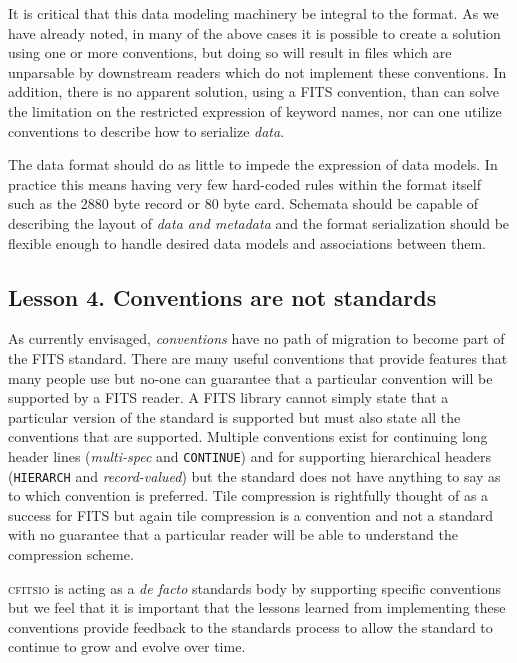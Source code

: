 \documentclass[final,authoryear,5p,times,twocolumn]{elsarticle}
\begin{document}
{{It is critical that this data modeling machinery be integral to the format.
As we have already noted, in many of the above cases it is possible to
create a solution using one or more conventions, but doing so will
result in files which are unparsable by downstream readers which
do not implement these conventions. In addition, there is no apparent
solution, using a FITS convention, than can solve the limitation on the
restricted expression of keyword names, nor can one utilize conventions
to describe how to serialize \textit{data}.


The data format should do as little to impede the expression of data
models.  In practice this means having very few hard-coded rules
within the format itself such as the 2880 byte record or 80 byte card.
Schemata should be capable of describing the layout of \textit{data and metadata}
 and the format serialization should be flexible enough to handle
desired data models and associations between them.


\subsection{Lesson 4. Conventions are not standards}

As currently envisaged, \emph{conventions} have no path of migration
to become part of the FITS standard. There are many useful conventions
that provide features that many people use but no-one can guarantee
that a particular convention will be supported by a FITS reader. A
FITS library cannot simply state that a particular version of the
standard is supported but must also state all the conventions that are
supported. Multiple conventions exist for
continuing long header lines (\emph{multi-spec} and \texttt{CONTINUE})
and for supporting hierarchical headers (\texttt{HIERARCH} and
\emph{record-valued}) but the standard does not have anything to say
as to which convention is preferred. Tile compression is rightfully
thought of as a success for FITS but again tile compression
\citep[e.g.,][]{2007ASPC..376..483S,2009PASP..121..414P} is a
convention and not a standard with no guarantee that a particular
reader will be able to understand the compression scheme.

\textsc{cfitsio} is acting as a \emph{de facto} standards body by
supporting specific conventions but we feel that it is important that
the lessons learned from implementing these conventions provide
feedback to the standards process to allow the standard to continue to
grow and evolve over time.

}}
\end{document}
